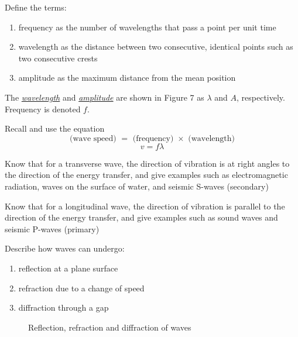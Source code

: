 \begin{point}
Define the terms:
\begin{enumerate}[label=(\alph*)]
	\setlength\itemsep{0em}
	\item frequency as the number of wavelengths that pass a point per unit time
	\item wavelength as the distance between two consecutive, identical points such as two consecutive crests
	\item amplitude as the maximum distance from the mean position
\end{enumerate}
\end{point}

The \ul{\emph{wavelength}} and \ul{\emph{amplitude}} are shown in Figure 7 as $\lambda$ and
$A$, respectively. Frequency is denoted $f$.

\begin{point}
Recall and use the equation
$$ \textrm{(wave speed) $=$ (frequency) $\times$ (wavelength)} $$
$$ v = f\lambda $$
\end{point}

\begin{point}
Know that for a transverse wave, the direction of vibration is at right angles to the direction of the energy 
transfer, and give examples such as electromagnetic radiation, waves on the surface of water, and seismic 
S-waves (secondary)
\end{point}

\begin{point}
Know that for a longitudinal wave, the direction of vibration is parallel to the direction of the energy 
transfer, and give examples such as sound waves and seismic P-waves (primary)
\end{point}

\begin{point}
Describe how waves can undergo:
\begin{enumerate}[label=(\alph*)]
	\setlength\itemsep{0em}
	\item reflection at a plane surface
	\item refraction due to a change of speed
	\item diffraction through a gap
\end{enumerate}
\end{point}

\begin{figure}
	\centering

	\caption{Reflection, refraction and diffraction of waves}
\end{figure}
